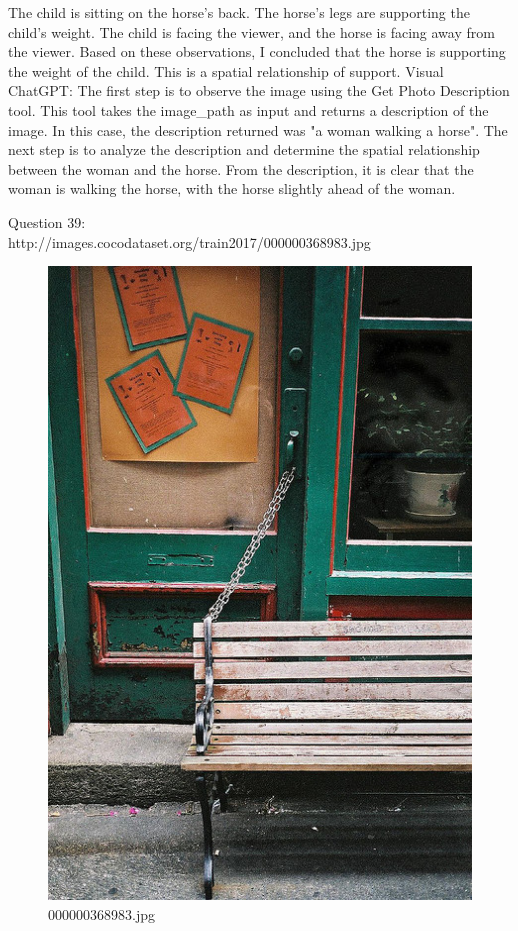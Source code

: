 \begin{enumerate}
        The child is sitting on the horse's back.
        The horse's legs are supporting the child's weight.
        The child is facing the viewer, and the horse is facing away from the viewer.
        Based on these observations, I concluded that the horse is supporting the weight of the child. This is a spatial relationship of support.
        \subitem Visual ChatGPT: The first step is to observe the image using the Get Photo Description tool. This tool takes the image\_path as input and returns a description of the image. In this case, the description returned was "a woman walking a horse".
        The next step is to analyze the description and determine the spatial relationship between the woman and the horse. From the description, it is clear that the woman is walking the horse, with the horse slightly ahead of the woman.
    \end{enumerate}
    Question 39:\\http://images.cocodataset.org/train2017/000000368983.jpg
    \begin{figure}[h]
        \centering
        \includegraphics[width=0.8\linewidth]{../image set/easy/000000368983.jpg}
        \caption{000000368983.jpg}
    \end{figure}
